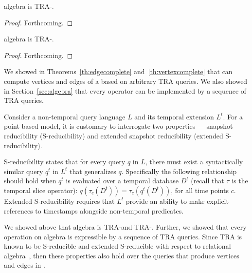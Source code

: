 \begin{theorem}
\ql algebra is TRA-\edgec.
\label{th:edgecomplete}
\end{theorem}

\begin{proof}  Forthcoming.
\end{proof}

\begin{theorem}
\ql algebra is TRA-\vertexc.
\label{th:vertexcomplete}
\end{theorem}

\begin{proof}  Forthcoming.
\end{proof}

We showed in Theorems~\ref{th:edgecomplete}
and~\ref{th:vertexcomplete} that \ql can compute vertices and edges of
a \tg based on arbitrary TRA queries.  We also showed in
Section~\ref{sec:algebra} that every \ql operator can be implemented
by a sequence of TRA queries.

Consider a non-temporal query language $L$ and its temporal extension
$L^t$.  For a point-based model, it is customary to interrogate two
properties --- snapshot reducibility (S-reducibility) and extended
snapshot reducibility (extended S-reducibility).

S-reducibility states that for every query $q$ in $L$, there must
exist a syntactically similar query $q^t$ in $L^t$ that generalizes
$q$.  Specifically the following relationship should hold when $q^t$
is evaluated over a temporal database $D^t$ (recall that $\tau$ is the
temporal slice operator): $q(\tau_c(D^t)) = \tau_c(q^t(D^t))$, for all
time points $c$.  Extended S-reducibility requires that $L^t$ provide
an ability to make explicit references to timestamps alongside
non-temporal predicates.

 We showed above that \ql algebra
is TRA-\edgec and TRA-\vertexc.  Further, we showed that every
operation on \ql algebra is expressible by a sequence of TRA
queries. Since TRA is known to be S-reducible and extended S-reducible
with respect to relational algebra~\cite{}, then these properties also
hold over the queries that produce vertices and edges in \ql.



